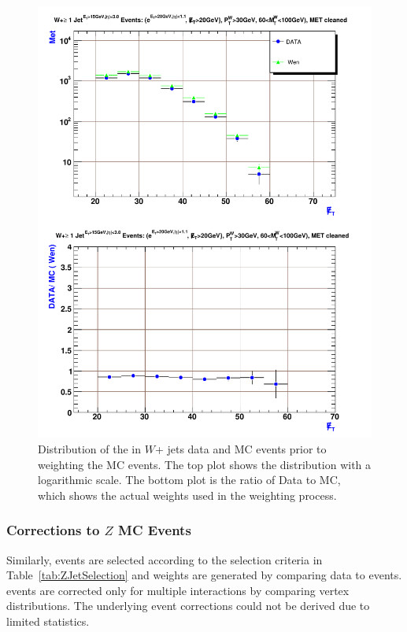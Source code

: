 \begin{figure}[p]
 \centering
 \includegraphics[scale=0.8,keepaspectratio=true]{./WJets_MetWgts.pdf}
 \caption{Distribution of the \met in $W$+ jets data and MC events prior to weighting the MC events. The top plot shows the distribution with a logarithmic scale. The bottom plot is the ratio of Data to MC, which shows the actual weights used in the weighting process.} \label{fig:WJets_MetWgts}
\end{figure}

\subsubsection{Corrections to $Z$ MC Events}\label{sec:ewkZMCcorrections}
Similarly, \zjets events are selected according to the selection criteria in Table~\ref{tab:ZJetSelection} and weights are generated by comparing data to \MC events. \zjets events are corrected only for multiple interactions by comparing vertex distributions. The underlying event corrections could not be derived due to limited statistics.

